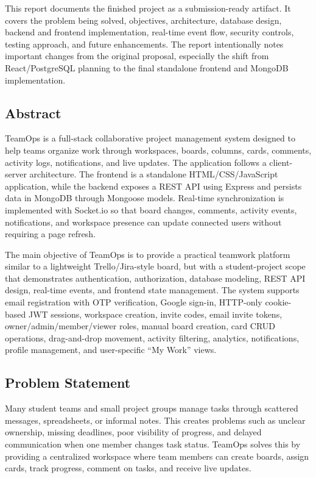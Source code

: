 \documentclass[
]{article}
\begin{document}
This report documents the finished project as a submission-ready
artifact. It covers the problem being solved, objectives, architecture,
database design, backend and frontend implementation, real-time event
flow, security controls, testing approach, and future enhancements. The
report intentionally notes important changes from the original proposal,
especially the shift from React/PostgreSQL planning to the final
standalone frontend and MongoDB implementation.

\subsection{Abstract}\label{abstract}

TeamOps is a full-stack collaborative project management system designed
to help teams organize work through workspaces, boards, columns, cards,
comments, activity logs, notifications, and live updates. The
application follows a client-server architecture. The frontend is a
standalone HTML/CSS/JavaScript application, while the backend exposes a
REST API using Express and persists data in MongoDB through Mongoose
models. Real-time synchronization is implemented with Socket.io so that
board changes, comments, activity events, notifications, and workspace
presence can update connected users without requiring a page refresh.

The main objective of TeamOps is to provide a practical teamwork
platform similar to a lightweight Trello/Jira-style board, but with a
student-project scope that demonstrates authentication, authorization,
database modeling, REST API design, real-time events, and frontend state
management. The system supports email registration with OTP
verification, Google sign-in, HTTP-only cookie-based JWT sessions,
workspace creation, invite codes, email invite tokens,
owner/admin/member/viewer roles, manual board creation, card CRUD
operations, drag-and-drop movement, activity filtering, analytics,
notifications, profile management, and user-specific ``My Work'' views.

\subsection{Problem Statement}\label{problem-statement}

Many student teams and small project groups manage tasks through
scattered messages, spreadsheets, or informal notes. This creates
problems such as unclear ownership, missing deadlines, poor visibility
of progress, and delayed communication when one member changes task
status. TeamOps solves this by providing a centralized workspace where
team members can create boards, assign cards, track progress, comment on
tasks, and receive live updates.
\end{document}
